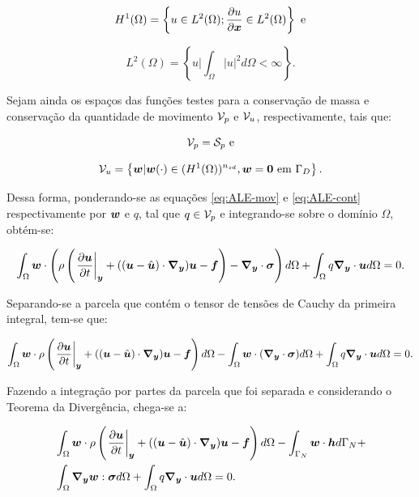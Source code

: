 \begin{equation}
    H^1(\Omega)=\left\{u\in L^2(\Omega);\frac{\partial{u}}{\partial{\boldsymbol{x}}}\in L^2(\Omega)\right\}\text{ e}
\end{equation}

\begin{equation}
    L^2(\Omega)=\left\{u\big|\int_\Omega{|u|^2d\Omega}<\infty\right\}\text{.}
\end{equation}

Sejam ainda os espaços das funções testes para a conservação de massa e conservação da quantidade de movimento $\mathcal{V}_p$ e $\mathcal{V}_u$, respectivamente, tais que:

\begin{equation}
    \mathcal{V}_p=\mathcal{S}_p\text{ e}
\end{equation}

\begin{equation}
    \mathcal{V}_u=\left\{\boldsymbol{w}|\boldsymbol{w}(\cdot)\in(H^1(\Omega))^{n_{sd}},\boldsymbol{w}=\boldsymbol{0}\text{ em }\Gamma_D\right\}\text{.}
\end{equation}

Dessa forma, ponderando-se as equações \eqref{eq:ALE-mov} e \eqref{eq:ALE-cont} respectivamente por $\boldsymbol{w}$ e $q$, tal que $q\in\mathcal{V}_p$ e integrando-se sobre o domínio $\Omega$, obtém-se:

\begin{equation}
    \int_{\Omega}{\boldsymbol{w}\cdot\left({\rho\left({\left.\frac{\partial \boldsymbol{u}}{\partial t}\right|_{\boldsymbol{y}}+((\boldsymbol{u}-\hat{\boldsymbol{u}})\cdot\boldsymbol{\nabla_y})\boldsymbol{u}-\boldsymbol{f}}\right)-\boldsymbol{\nabla_y}\cdot\boldsymbol{\sigma}}\right) d\Omega}+\int_{\Omega}{q\boldsymbol{\nabla_y}\cdot\boldsymbol{u} d\Omega}=0\text{.}
\end{equation}

Separando-se a parcela que contém o tensor de tensões de Cauchy da primeira integral, tem-se que:

\[\int_{\Omega}{\boldsymbol{w}\cdot\rho\left({\left.\frac{\partial \boldsymbol{u}}{\partial t}\right|_{\boldsymbol{y}}+((\boldsymbol{u}-\hat{\boldsymbol{u}})\cdot\boldsymbol{\nabla_y})\boldsymbol{u}-\boldsymbol{f}}\right) d\Omega}-\int_{\Omega}{\boldsymbol{w}\cdot(\boldsymbol{\nabla_y}\cdot\boldsymbol{\sigma}) d\Omega}+\int_{\Omega}{q\boldsymbol{\nabla_y}\cdot\boldsymbol{u} d\Omega}=0\text{.}\]

Fazendo a integração por partes da parcela que foi separada e considerando o Teorema da Divergência, chega-se a:

\begin{equation}
    \begin{split}
        &\int_{\Omega}{\boldsymbol{w}\cdot\rho\left({\left.\frac{\partial \boldsymbol{u}}{\partial t}\right|_{\boldsymbol{y}}+((\boldsymbol{u}-\hat{\boldsymbol{u}})\cdot\boldsymbol{\nabla_y})\boldsymbol{u}-\boldsymbol{f}}\right) d\Omega}-\int_{\Gamma_N}{\boldsymbol{w}\cdot\boldsymbol{h} d\Gamma_N}+\\
        &\int_{\Omega}{\boldsymbol{\nabla_y}\boldsymbol{w}:\boldsymbol{\sigma} d\Omega}+\int_{\Omega}{q\boldsymbol{\nabla_y}\cdot\boldsymbol{u} d\Omega}=0\text{.}
    \end{split}
    \label{eq:WeakForm2}
\end{equation}

